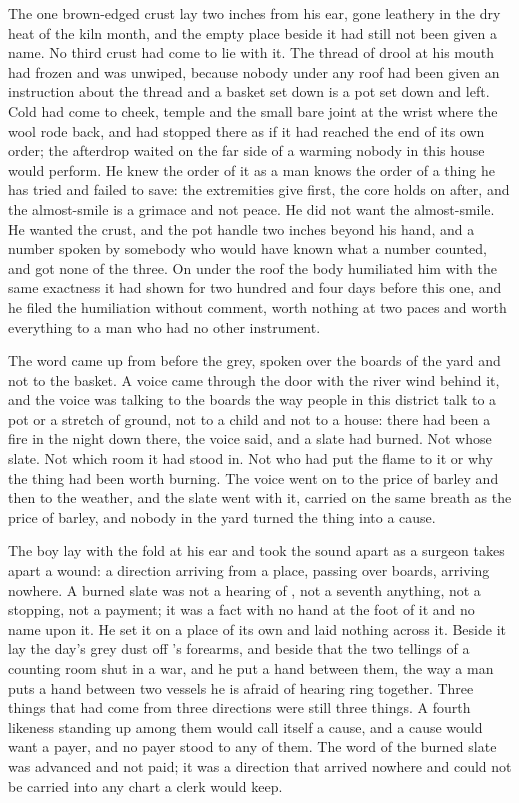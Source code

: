 The one brown-edged crust lay two inches from his ear, gone leathery in the dry heat of the kiln month, and the empty place beside it had still not been given a name. No third crust had come to lie with it. The thread of drool at his mouth had frozen and was unwiped, because nobody under any roof had been given an instruction about the thread and a basket set down is a pot set down and left. Cold had come to cheek, temple and the small bare joint at the wrist where the wool rode back, and had stopped there as if it had reached the end of its own order; the afterdrop waited on the far side of a warming nobody in this house would perform. He knew the order of it as a man knows the order of a thing he has tried and failed to save: the extremities give first, the core holds on after, and the almost-smile is a grimace and not peace. He did not want the almost-smile. He wanted the crust, and the pot handle two inches beyond his hand, and a number spoken by somebody who would have known what a number counted, and got none of the three. On  under the roof the body humiliated him with the same exactness it had shown for two hundred and four days before this one, and he filed the humiliation without comment, worth nothing at two paces and worth everything to a man who had no other instrument.

\scenebreak

The word came up from  before the grey, spoken over the boards of the yard and not to the basket. A voice came through the door with the river wind behind it, and the voice was talking to the boards the way people in this district talk to a pot or a stretch of ground, not to a child and not to a house: there had been a fire in the night down there, the voice said, and a slate had burned. Not whose slate. Not which room it had stood in. Not who had put the flame to it or why the thing had been worth burning. The voice went on to the price of barley and then to the weather, and the slate went with it, carried on the same breath as the price of barley, and nobody in the yard turned the thing into a cause.

The boy lay with the fold at his ear and took the sound apart as a surgeon takes apart a wound: a direction arriving from a place, passing over boards, arriving nowhere. A burned slate was not a hearing of , not a seventh anything, not a stopping, not a payment; it was a fact with no hand at the foot of it and no name upon it. He set it on a place of its own and laid nothing across it. Beside it lay the day's grey dust off 's forearms, and beside that the two tellings of a counting room shut in a war, and he put a hand between them, the way a man puts a hand between two vessels he is afraid of hearing ring together. Three things that had come from three directions were still three things. A fourth likeness standing up among them would call itself a cause, and a cause would want a payer, and no payer stood to any of them. The word of the burned slate was advanced and not paid; it was a direction that arrived nowhere and could not be carried into any chart a clerk would keep.

